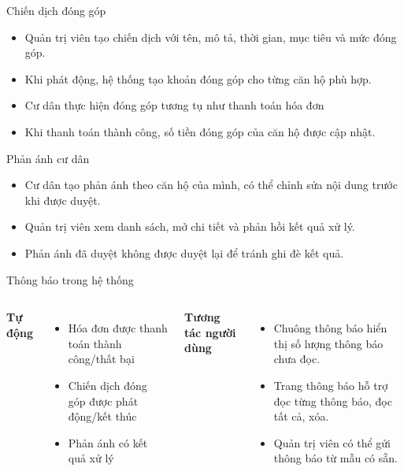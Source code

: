 \documentclass[t, aspectratio=169]{beamer}
\begin{document}
\begin{frame}{Chiến dịch đóng góp}

\begin{itemize}
  \item Quản trị viên tạo chiến dịch với tên, mô tả, thời gian, mục tiêu và mức đóng góp.
  \item Khi phát động, hệ thống tạo khoản đóng góp cho từng căn hộ phù hợp.
  \item Cư dân thực hiện đóng góp tương tụ như thanh toán hóa đơn
  \item Khi thanh toán thành công, số tiền đóng góp của căn hộ được cập nhật.
\end{itemize}

\end{frame}

\begin{frame}{Phản ánh cư dân}

\begin{itemize}
  \item Cư dân tạo phản ánh theo căn hộ của mình, có thể chỉnh sửa nội dung trước khi được duyệt.
  \item Quản trị viên xem danh sách, mở chi tiết và phản hồi kết quả xử lý.
  \item Phản ánh đã duyệt không được duyệt lại để tránh ghi đè kết quả.
\end{itemize}
\end{frame}

\begin{frame}{Thông báo trong hệ thống}
\begin{columns}[T,onlytextwidth]
\textbf{\textcolor{hustprimary}{Tự động}}
\begin{itemize}
  \item Hóa đơn được thanh toán thành công/thất bại
  \item Chiến dịch đóng góp được phát động/kết thúc 
  \item Phản ánh có kết quả xử lý
\end{itemize}
\textbf{\textcolor{hustprimary}{Tương tác người dùng}}
\begin{itemize}
  \item Chuông thông báo hiển thị số lượng thông báo chưa đọc.
  \item Trang thông báo hỗ trợ đọc từng thông báo, đọc tất cả, xóa.
  \item Quản trị viên có thể gửi thông báo từ mẫu có sẵn.
\end{itemize}
\end{columns}
\end{frame}
\end{document}
